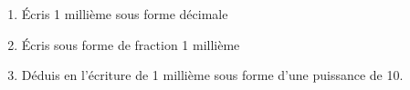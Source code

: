 
\begin{enumerate}
\item Écris 1 millième sous forme décimale
\item Écris sous forme de fraction 1 millième
\item Déduis en l'écriture de 1 millième sous forme d'une puissance de 10.
\end{enumerate}